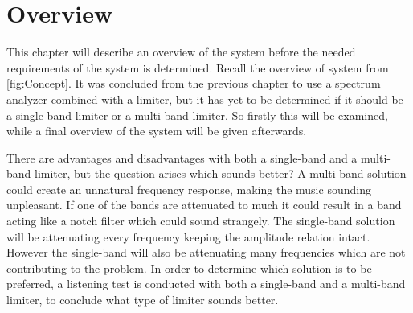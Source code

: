 \chapter{Overview} \label{ch:overview}
This chapter will describe an overview of the system before the needed requirements of the system is determined. Recall the overview of system from \autoref{fig:Concept}. It was concluded from the previous chapter to use a spectrum analyzer combined with a limiter, but it has yet to be determined if it should be a single-band limiter or a multi-band limiter. So firstly this will be examined, while a final overview of the system will be given afterwards. 


There are advantages and disadvantages with both a single-band and a multi-band limiter, but the question arises which sounds better?
A multi-band solution could create an unnatural frequency response, making the music sounding unpleasant. If one of the bands are attenuated to much it could result in a band acting like a notch filter which could sound strangely. The single-band solution will be attenuating every frequency keeping the amplitude relation intact. However the single-band will also be attenuating many frequencies which are not contributing to the problem. In order to determine which solution is to be preferred, a listening test is conducted with both a single-band and a multi-band limiter, to conclude what type of limiter sounds better. 

